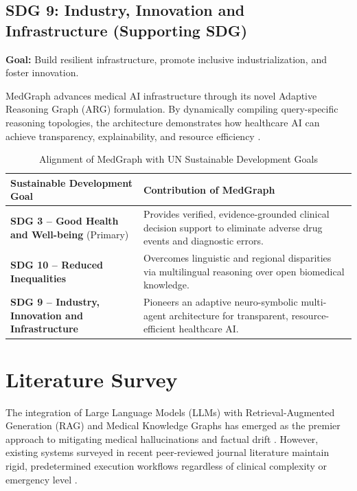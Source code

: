\documentclass[conference]{IEEEtran}
\begin{document}
\subsection{SDG 9: Industry, Innovation and Infrastructure (Supporting SDG)}
\textbf{Goal:} Build resilient infrastructure, promote inclusive industrialization, and foster innovation.

MedGraph advances medical AI infrastructure through its novel Adaptive Reasoning Graph (ARG) formulation. By dynamically compiling query-specific reasoning topologies, the architecture demonstrates how healthcare AI can achieve transparency, explainability, and resource efficiency \cite{LAWANNA2026100926,info17020133}.

\begin{table}[htbp]
\centering
\caption{Alignment of MedGraph with UN Sustainable Development Goals}
\label{tab:sdg_summary}
\begin{tabular}{|p{3.2cm}|p{4.5cm}|}
\hline
\textbf{Sustainable Development Goal} & \textbf{Contribution of MedGraph} \\
\hline
\textbf{SDG 3 -- Good Health and Well-being} (Primary) & Provides verified, evidence-grounded clinical decision support to eliminate adverse drug events and diagnostic errors. \\
\hline
\textbf{SDG 10 -- Reduced Inequalities} & Overcomes linguistic and regional disparities via multilingual reasoning over open biomedical knowledge. \\
\hline
\textbf{SDG 9 -- Industry, Innovation and Infrastructure} & Pioneers an adaptive neuro-symbolic multi-agent architecture for transparent, resource-efficient healthcare AI. \\
\hline
\end{tabular}
\end{table}

\section{Literature Survey}

The integration of Large Language Models (LLMs) with Retrieval-Augmented Generation (RAG) and Medical Knowledge Graphs has emerged as the premier approach to mitigating medical hallucinations and factual drift \cite{THIRUNAVUKARASU2023,ZAKKA2024,WANG2025100504}. However, existing systems surveyed in recent peer-reviewed journal literature maintain rigid, predetermined execution workflows regardless of clinical complexity or emergency level \cite{info17020133,ai6100240,BAO2024102768}.
\end{document}
